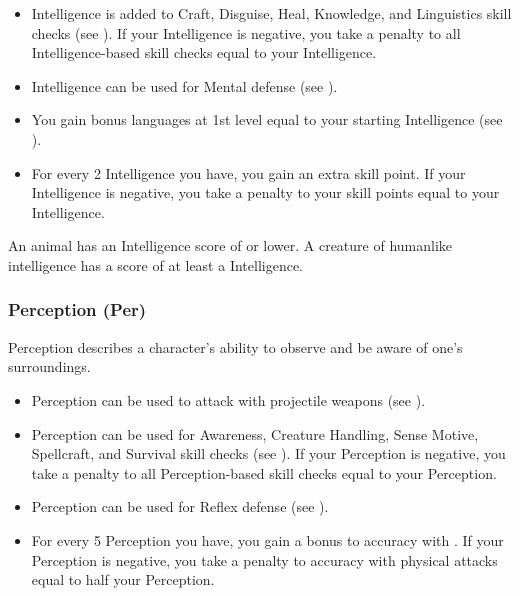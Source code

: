             \begin{itemize}
                \item Intelligence is added to Craft, Disguise, Heal, Knowledge, and Linguistics skill checks (see ). If your Intelligence is negative, you take a penalty to all Intelligence-based skill checks equal to your Intelligence.
                \item Intelligence can be used for Mental defense (see ).
                \item You gain bonus languages at 1st level equal to your starting Intelligence (see ).
                \item For every 2 Intelligence you have, you gain an extra skill point. If your Intelligence is negative, you take a penalty to your skill points equal to your Intelligence.
            \end{itemize}

            \par An animal has an Intelligence score of  or lower.
            A creature of humanlike intelligence has a score of at least a  Intelligence.

        \subsubsection{Perception (Per)}\label{Perception}
            Perception describes a character's ability to observe and be aware of one's surroundings.
            \begin{itemize}
                \item Perception can be used to attack with projectile weapons (see ).
                \item Perception can be used for Awareness, Creature Handling, Sense Motive, Spellcraft, and Survival skill checks (see ). If your Perception is negative, you take a penalty to all Perception-based skill checks equal to your Perception.
                \item Perception can be used for Reflex defense (see ).
                \item For every 5 Perception you have, you gain a  bonus to accuracy with .
                    If your Perception is negative, you take a penalty to accuracy with physical attacks equal to half your Perception.
            \end{itemize}

